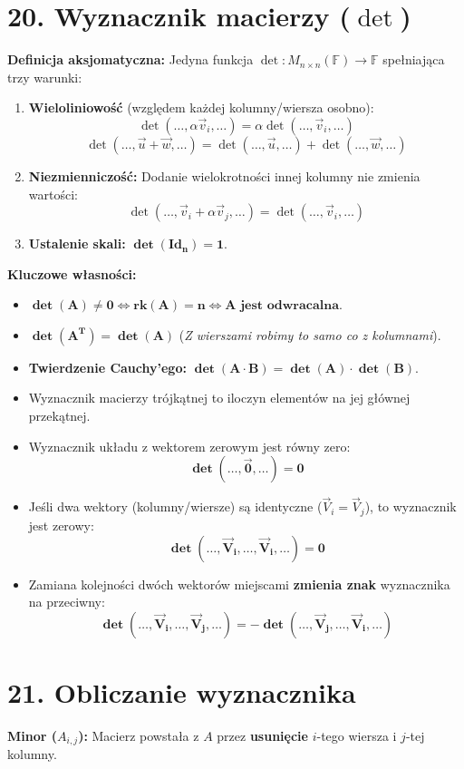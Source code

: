 \documentclass[12pt,a4paper]{article}
\begin{document}
\section*{20. Wyznacznik macierzy ($\det$)}
\noindent\textbf{Definicja aksjomatyczna:} Jedyna funkcja $\det: M_{n \times n}(\mathbb{F}) \to \mathbb{F}$ spełniająca trzy warunki: %
\begin{enumerate}
    \item \textbf{Wieloliniowość} (względem każdej kolumny/wiersza osobno):
    $$ \det(\dots, \alpha\vec{v}_i, \dots) = \alpha \det(\dots, \vec{v}_i, \dots) $$
    $$ \det(\dots, \vec{u} + \vec{w}, \dots) = \det(\dots, \vec{u}, \dots) + \det(\dots, \vec{w}, \dots) $$
    \item \textbf{Niezmienniczość:} Dodanie wielokrotności innej kolumny nie zmienia wartości:
    $$ \det(\dots, \vec{v}_i + \alpha\vec{v}_j, \dots) = \det(\dots, \vec{v}_i, \dots) $$
    \item \textbf{Ustalenie skali:} $\mathbf{\det(Id_n) = 1}$.
\end{enumerate}

\noindent\textbf{Kluczowe własności:}
\begin{itemize}
    \item $\mathbf{\det(A) \neq 0 \iff rk(A) = n \iff A \text{ jest odwracalna}}$. %
    \item $\mathbf{\det(A^T) = \det(A)}$ (\textit{Z wierszami robimy to samo co z kolumnami}). %
    \item \textbf{Twierdzenie Cauchy'ego:} $\mathbf{\det(A \cdot B) = \det(A) \cdot \det(B)}$. %
    \item Wyznacznik macierzy trójkątnej to iloczyn elementów na jej głównej przekątnej. %
    \item Wyznacznik układu z wektorem zerowym jest równy zero: 
    $$ \mathbf{\det(\dots, \vec{0}, \dots) = 0} $$
    \item Jeśli dwa wektory (kolumny/wiersze) są identyczne ($\vec{V}_i = \vec{V}_j$), to wyznacznik jest zerowy:
    $$ \mathbf{\det(\dots, \vec{V}_i, \dots, \vec{V}_i, \dots) = 0} $$
    \item Zamiana kolejności dwóch wektorów miejscami \textbf{zmienia znak} wyznacznika na przeciwny:
    $$ \mathbf{\det(\dots, \vec{V}_i, \dots, \vec{V}_j, \dots) = -\det(\dots, \vec{V}_j, \dots, \vec{V}_i, \dots)} $$
\end{itemize}

\section*{21. Obliczanie wyznacznika}
\noindent\textbf{Minor ($A_{i,j}$):} Macierz powstała z $A$ przez \textbf{usunięcie} $i$-tego wiersza i $j$-tej kolumny. %
\end{document}
